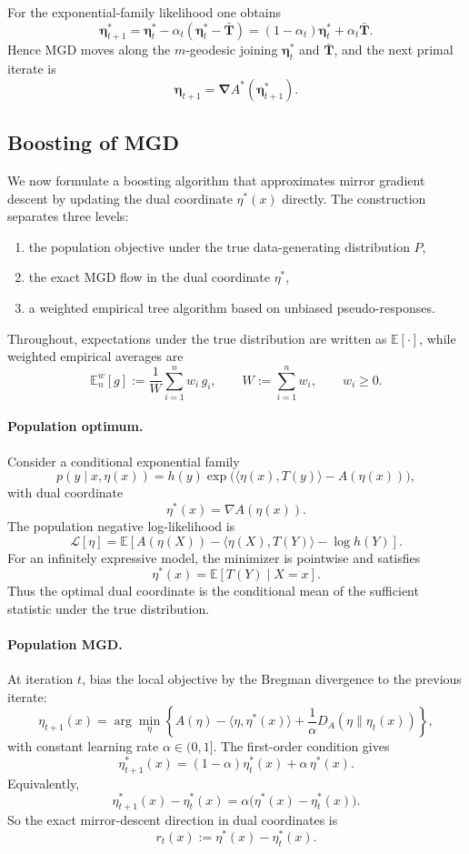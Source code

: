 \documentclass[11pt]{article}
\newcommand{\be}{{\bm{\eta}}}
\newcommand{\bT}{\bm{T}}
\newcommand{\bNabla}{\bm{\nabla}}
\begin{document}
For the exponential-family likelihood one obtains
\[
\be^\ast_{t+1}
=
\be^\ast_t-\alpha_t(\be^\ast_t-\bar{\bT})
=
(1-\alpha_t)\be^\ast_t+\alpha_t\bar{\bT}.
\]
Hence MGD moves along the \(m\)-geodesic joining \(\be_t^\ast\) and \(\bar{\bT}\), and the next primal iterate is
\[
\be_{t+1}=\bNabla A^\ast(\be^\ast_{t+1}).
\]

\subsection{Boosting of MGD}

We now formulate a boosting algorithm that approximates mirror gradient descent by updating the dual coordinate \(\eta^\ast(x)\) directly. The construction separates three levels:

\begin{enumerate}[leftmargin=2em]
\item the population objective under the true data-generating distribution \(P\),
\item the exact MGD flow in the dual coordinate \(\eta^\ast\),
\item a weighted empirical tree algorithm based on unbiased pseudo-responses.
\end{enumerate}

Throughout, expectations under the true distribution are written as \(\mathbb E[\cdot]\), while weighted empirical averages are
\[
\mathbb E_n^w[g]
:=
\frac{1}{W}\sum_{i=1}^n w_i\,g_i,
\qquad
W:=\sum_{i=1}^n w_i,
\qquad
w_i\ge 0.
\]

\paragraph{Population optimum.}
Consider a conditional exponential family
\[
p(y\mid x,\eta(x))
=
h(y)\exp\!\big(\langle \eta(x),T(y)\rangle-A(\eta(x))\big),
\]
with dual coordinate
\[
\eta^\ast(x)=\nabla A(\eta(x)).
\]
The population negative log-likelihood is
\[
\mathcal L[\eta]
=
\mathbb E\!\left[A(\eta(X))-\langle \eta(X),T(Y)\rangle-\log h(Y)\right].
\]
For an infinitely expressive model, the minimizer is pointwise and satisfies
\[
\eta^\ast(x)=\mathbb E[T(Y)\mid X=x].
\]
Thus the optimal dual coordinate is the conditional mean of the sufficient statistic under the true distribution.

\paragraph{Population MGD.}
At iteration \(t\), bias the local objective by the Bregman divergence to the previous iterate:
\[
\eta_{t+1}(x)
=
\arg\min_{\eta}
\left\{
A(\eta)-\langle \eta,\eta^\ast(x)\rangle
+\frac{1}{\alpha}D_A(\eta\|\eta_t(x))
\right\},
\]
with constant learning rate \(\alpha\in(0,1]\). The first-order condition gives
\[
\eta^\ast_{t+1}(x)
=
(1-\alpha)\eta^\ast_t(x)+\alpha\,\eta^\ast(x).
\]
Equivalently,
\[
\eta^\ast_{t+1}(x)-\eta^\ast_t(x)
=
\alpha\big(\eta^\ast(x)-\eta^\ast_t(x)\big).
\]
So the exact mirror-descent direction in dual coordinates is
\[
r_t(x):=\eta^\ast(x)-\eta^\ast_t(x).
\]
\end{document}
